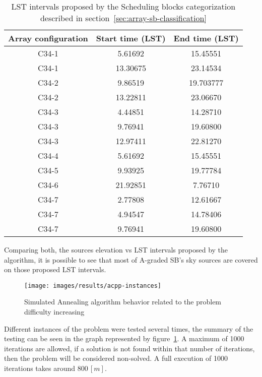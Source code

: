 \begin{table}[htbp]
\begin{center}
\begin{tabular}{|c|c|c|}
\hline
Array configuration & Start time (LST) & End time (LST) \\ \hline
C34-1 & 5.61692 & 15.45551 \\ \hline
C34-1 & 13.30675 & 23.14534 \\ \hline
C34-2 & 9.86519 & 19.703777 \\ \hline
C34-2 & 13.22811 & 23.06670 \\ \hline
C34-3 & 4.44851 & 14.28710 \\ \hline
C34-3 & 9.76941 & 19.60800 \\ \hline
C34-3 & 12.97411 & 22.81270 \\ \hline
C34-4 & 5.61692 & 15.45551 \\ \hline
C34-5 & 9.93925 & 19.77784 \\ \hline
C34-6 & 21.92851 & 7.76710 \\ \hline
C34-7 & 2.77808 & 12.61667 \\ \hline
C34-7 & 4.94547 & 14.78406 \\ \hline
C34-7 & 9.76941 & 19.60800 \\ \hline
\end{tabular}
\end{center}
\caption[LST intervals proposed by the Scheduling Blocks categorization]
{LST intervals proposed by the Scheduling blocks categorization described in section~\ref{sec:array-sb-classification}}
\label{table:lst-int-prop}
\end{table}

Comparing both, the sources elevation vs LST intervals proposed by the algorithm, it is possible to see that most of A-graded SB's sky sources are covered on those proposed LST intervals.

\begin{figure}[htbp]
\begin{center}
\texttt{[image: images/results/acpp-instances]}
\end{center}
\caption{Simulated Annealing algorithm behavior related to the problem difficulty increasing}
\label{fig:acpp-behavior}
\end{figure}

Different instances of the problem were tested several times, the summary of the testing can be seen in the graph represented by figure~\ref{fig:acpp-behavior}. A maximum of 1000 iterations are allowed, if a solution is not found within that number of iterations, then the problem will be considered non-solved. A full execution of 1000 iterations takes around $800\,[m]$.


